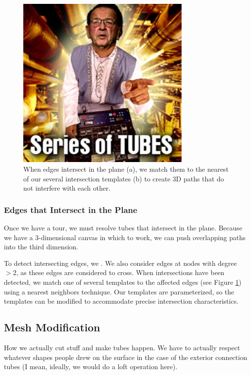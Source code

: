 \begin{figure}[h!]
\centering
    \includegraphics[width=3.4in]{figures/series-of-tubes.jpg}
\caption{When edges intersect in the plane (a), we match them to the nearest of our several intersection templates (b) to create 3D paths that do not interfere with each other.}
\label{fig:templates}
\end{figure}

\subsubsection{Edges that Intersect in the Plane}
Once we have a tour, we must resolve tubes that intersect in the plane.  Because we have a 3-dimensional canvas in which to work, we can push overlapping paths into the third dimension.

To detect intersecting edges, we .  We also consider edges at nodes with degree $>2$, as these edges are considered to cross.  When intersections have been detected, we match one of several templates to the affected edges (see Figure \ref{fig:templates}) using a nearest neighbors technique.  Our templates are parameterized, so the templates can be modified to accommodate precise intersection characteristics.

\subsection{Mesh Modification}

How we actually cut stuff and make tubes happen.   We have to actually respect whatever shapes people drew on the surface in the case of the exterior connection tubes (I mean, ideally, we would do a loft operation here).

